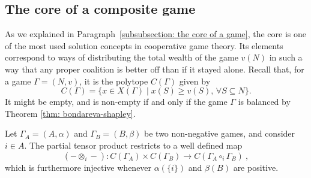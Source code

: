 \documentclass[a4paper,12pt]{amsart}
\begin{document}
\subsection{The core of a composite game}\label{Subsection: the core of a composite game}
As we explained in Paragraph~\ref{subsubsection: the core of a game}, the core is one of the most used solution concepts in cooperative game theory. Its elements correspond to ways of distributing the total wealth of the game $v(N)$ in such a way that any proper coalition is better off than if it stayed alone. Recall that, for a game \(\Gamma = (N, v)\), it is the polytope $C(\Gamma)$ given by 
\[
C(\Gamma) = \{x \in X(\Gamma) \mid x(S) \geq v(S), \hspace{2pt} \forall S \subseteq N\}. 
\]
It might be empty, and is non-empty if and only if the game $\Gamma$ is balanced by Theorem \ref{thm: bondareva-shapley}. 

\begin{theorem}\label{thm: inclusion of the tensor i of the cores}
Let \(\Gamma_A = (A, \alpha)\) and \(\Gamma_B = (B, \beta)\) be two non-negative games, and consider \(i \in A\). The partial tensor product restricts to a well defined map
    \[
    (- \otimes_i -): C(\Gamma_A) \times C(\Gamma_B) \longrightarrow C(\Gamma_A \circ_i \Gamma_B)~, 
    \]
which is furthermore injective whenever $\alpha(\{i\})$ and $\beta(B)$ are positive. 
\end{theorem}
\end{document}
